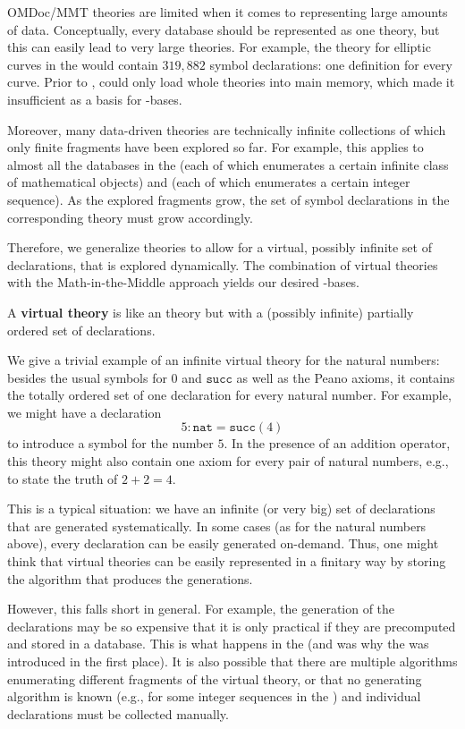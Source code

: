 OMDoc/MMT theories are limited when it comes to representing large amounts of data.
Conceptually, every database should be represented as one theory, but this can easily lead
to very large theories.  For example, the theory for elliptic curves in the \LMFDB would
contain $319{,}882$ symbol declarations: one definition for every curve.  Prior to \pn, \MMT
could only load whole theories into main memory, which made it insufficient as a basis for
\DKS-bases.

Moreover, many data-driven theories are technically infinite collections of which only finite fragments have been explored so far.
For example, this applies to almost all the databases in the \LMFDB (each of which enumerates a certain infinite class of mathematical objects) and \OEIS (each of which enumerates a certain integer sequence).
As the explored fragments grow, the set of symbol declarations in the corresponding \MMT theory must grow accordingly.

Therefore, we generalize \MMT theories to allow for a virtual, possibly infinite set of declarations, that is explored dynamically.
The combination of virtual theories with the Math-in-the-Middle approach yields our desired \DKS-bases.

\begin{mydef}
  A \textbf{virtual theory} is like an \MMT theory but with a (possibly infinite) partially ordered set of declarations.
\end{mydef}

We give a trivial example of an infinite virtual theory for the natural numbers:
besides the usual symbols for $0$ and $\mathtt{succ}$ as well as the Peano axioms, it contains the totally ordered set of one declaration for every natural number.
For example, we might have a declaration
 \[5:\mathtt{nat}=\mathtt{succ}(4)\]
to introduce a symbol for the number $5$.
In the presence of an addition operator, this theory might also contain one axiom for every pair of natural numbers, e.g., to state the truth of $2+2=4$.

This is a typical situation: we have an infinite (or very big) set of declarations that are generated systematically.
In some cases (as for the natural numbers above), every declaration can be easily generated on-demand.
Thus, one might think that virtual theories can be easily represented in a finitary way by storing the algorithm that produces the generations.

However, this falls short in general.  For example, the generation of the declarations may be
so expensive that it is only practical if they are precomputed and stored in a database.
This is what happens in the \LMFDB (and was why the \LMFDB was introduced in the first
place).  It is also possible that there are multiple algorithms enumerating different
fragments of the virtual theory, or that no generating algorithm is known (e.g., for some
integer sequences in the \OEIS) and individual declarations must be collected manually.

